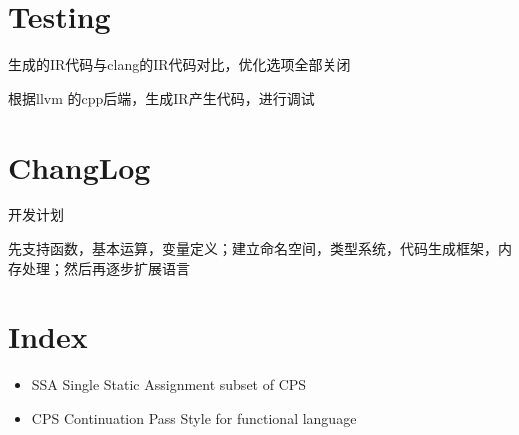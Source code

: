 \documentclass[11pt]{article} %
\begin{document}
\section{Testing}
生成的IR代码与clang的IR代码对比，优化选项全部关闭


根据llvm 的cpp后端，生成IR产生代码，进行调试
\section{ChangLog}
开发计划 

先支持函数，基本运算，变量定义；建立命名空间，类型系统，代码生成框架，内存处理；然后再逐步扩展语言

\section{Index}
\begin{itemize}
\item SSA Single Static Assignment subset of CPS
\item CPS Continuation Pass Style for functional language
\end{itemize}
\end{document}
